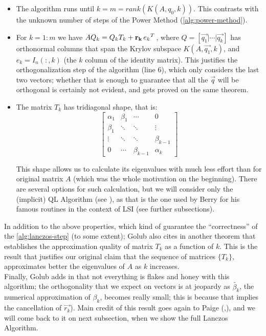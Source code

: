 \begin{itemize}
  \item The algorithm runs until $k = m = rank(K(A,q_0,k))$. This contrasts 
    with the unknown number of steps of the Power Method
    (\cref{alg:power-method}). \\

  \item For $k = 1:m$ we have $AQ_k = Q_kT_k + \mathbf{r_k}\,{e_k}^{T}\,$,
    where $Q = [\vec{q_1} | \cdots | \vec{q_k} ]$ has orthonormal
    columns that span the Krylov subspace $K(A,\vec{q_1},k)$, and $e_k
    = I_n(:,k)$ (the $k$ column of the identity matrix). This
    justifies the orthogonalization step of the algorithm (line 6),
    which only considers the last two vectors; whether that is enough to
    guarantee that all the $\vec{q}$ will be orthogonal is
    certainly not evident, and gets proved on the same theorem. \\

  \item The matrix $T_k$ has tridiagonal shape, that is: \\
    \[
    \begin{bmatrix}
      \alpha_1 & \beta_1 & \cdots      & 0          \\
      \beta_1  & \ddots  & \ddots      & \vdots     \\
      \vdots   & \ddots  & \ddots      & \beta_{k-1} \\
      0        & \cdots  & \beta_{k-1} & \alpha_k
    \end{bmatrix}
    \]
    \hfill

    This shape allows us to calculate its eigenvalues with much less
    effort than for original matrix $A$ (which was the whole
    motivation on the beginning). There are several options for such
    calculation, but we will consider only the (implicit) QL Algorithm
    (see \cite{dubrulle71}), as that is the one used by Berry for his
    famous routines in the context of LSI (see further
    subsections). 
\end{itemize}
\hfill

In addition to the above properties, which kind of guarantee the
``correctness'' of the \cref{alg:lanczos-step} (to some extent); Golub
also cites in \cite{golub13} another theorem that establishes the
approximation quality of matrix $T_k$ as a function of $k$. This is
the result that justifies our original claim that the sequence of
matrices $\{T_k\}$, approximates better the eigenvalues of $A$ as $k$
increases. \\

Finally, Golub adds in \cite{golub13} that not everything is flakes
and honey with this 
algorithm; the orthogonality that we expect on vectors 
is at jeopardy as $\tilde{\beta_k}$, the numerical approximation of
$\beta_k$, becomes really small; this is because that implies the
cancellation of $\vec{r_k}$). Main credit of this result goes again to
Paige (\cite{paige71},\cite{paige76}), and we will come back to 
it on next subsection, when we show the full Lanczos Algorithm.



